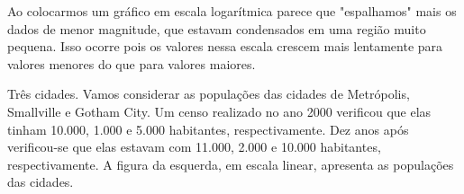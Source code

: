 
Ao colocarmos um gráfico em escala logarítmica parece que "espalhamos" mais os dados de menor magnitude, que estavam condensados em uma região muito pequena. Isso ocorre pois os valores nessa escala crescem mais lentamente para valores menores do que para valores maiores. %


\begin{task}{Três cidades.}
Vamos considerar as populações das cidades de Metrópolis, Smallville e Gotham City. Um censo realizado no ano 2000 verificou que elas tinham 10.000, 1.000 e 5.000 habitantes, respectivamente. Dez anos após verificou-se que elas estavam com 11.000, 2.000 e 10.000 habitantes, respectivamente. A figura da esquerda, em escala linear, apresenta as populações das cidades.



\end{task}

